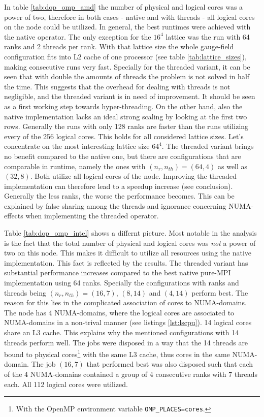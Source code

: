 \documentclass{article}
\theoremstyle{plain} %
\theoremstyle{convention} %
\theoremstyle{remark} %
\def\code#1{\texttt{#1}}
\numberwithin{equation}{section}
\begin{document}
In table \ref{tab:dop_omp_amd} the number of physical and logical cores was a power of two, therefore in both cases - native and with threads - all logical cores on the node could be utilized. In general, the best runtimes were achieved with the native operator. The only exception for the $16^4$ lattice was the run with \num{64} ranks and \num{2} threads per rank. With that lattice size the whole gauge-field configuration fits into L2 cache of one processor (see table \ref{tab:lattice_sizes}), making consecutive runs very fast. Specially for the threaded variant, it can be seen that with double the amounts of threads the problem is not solved in half the time. This suggests that the overhead for dealing with threads is not negligible, and the threaded variant is in need of improvement. It should be seen as a first working step towards hyper-threading. On the other hand, also the native implementation lacks an ideal strong scaling by looking at the first two rows. Generally the runs with only \num{128} ranks are faster than the runs utilizing every of the \num{256} logical cores. This holds for all considered lattice sizes. Let's concentrate on the most interesting lattice size $64^4$. The threaded variant brings no benefit compared to the native one, but there are configurations that are comparable in runtime, namely the ones with $(n_r, n_{th})=(64,4)$ as well as $(32,8)$. Both utilize all logical cores of the node. Improving the threaded implementation can therefore lead to a speedup increase (see conclusion). Generally the less ranks, the worse the performance becomes. This can be explained by false sharing among the threads and ignorance concerning NUMA-effects when implementing the threaded operator.

Table \ref{tab:dop_omp_intel} shows a differnt picture. Most notable in the analysis is the fact that the total number of physical and logical cores was \textit{not} a power of two on this node. This makes it difficult to utilize all resources using the native implementation. This fact is reflected by the results. The threaded variant has substantial performance increases compared to the best native pure-MPI implementation using \num{64} ranks. Specially the configurations with ranks and threads being $(n_r, n_{th})=(16,7)$, $(8,14)$ and $(4,14)$ perform best. The reason for this lies in the complicated association of cores to NUMA-domains. The node has \num{4} NUMA-domains, where the logical cores are associated to NUMA-domains in a non-trival manner (see listings \ref{lst:lscpu}). \num{14} logical cores share an L3 cache. This explains why the mentioned configurations with \num{14} threads perform well. The jobs were disposed in a way that the \num{14} threads are bound to physical cores\footnote{With the OpenMP environment variable \code{OMP\_PLACES=cores}.} with the same L3 cache, thus cores in the same NUMA-domain. The job $(16,7)$ that performed best was also disposed such that each of the \num{4} NUMA-domains contained a group of \num{4} consecutive ranks with \num{7} threads each. All \num{112} logical cores were utilized.
\end{document}
